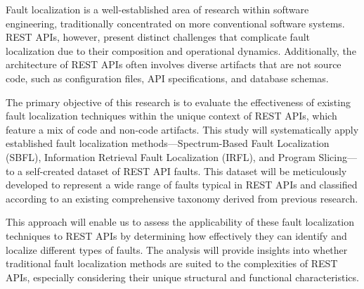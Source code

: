 \documentclass[conference]{IEEEtran}
\newcommand{\todo}[1]{\textcolor{red}{{\bfseries [[#1]]}}}
\begin{document}


    Fault localization is a well-established area of research within software engineering, traditionally concentrated on more conventional software systems. 
    REST APIs, however, present distinct challenges that complicate fault localization due to their composition and operational dynamics. 
    Additionally, the architecture of REST APIs often involves diverse artifacts that are not source code, such as configuration files, API specifications, and database schemas.



    The primary objective of this research is to evaluate the effectiveness of existing fault localization techniques within the unique context of REST APIs, which feature a mix of code and non-code artifacts. 
    This study will systematically apply established fault localization methods—Spectrum-Based Fault Localization (SBFL), Information Retrieval Fault Localization (IRFL), and Program Slicing—to a self-created dataset of REST API faults. 
    This dataset will be meticulously developed to represent a wide range of faults typical in REST APIs and classified according to an existing comprehensive taxonomy derived from previous research.

    This approach will enable us to assess the applicability of these fault localization techniques to REST APIs by determining how effectively they can identify and localize different types of faults. 
    The analysis will provide insights into whether traditional fault localization methods are suited to the complexities of REST APIs, especially considering their unique structural and functional characteristics.
\end{document}
